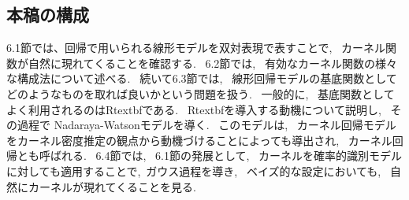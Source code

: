 \documentclass[11pt,a4paper]{jreport}
\begin{document}
\subsection*{本稿の構成}
6.1節では、回帰で用いられる線形モデルを双対表現で表すことで,~ カーネル関数が自然に現れてくることを確認する.~ 6.2節では,~ 有効なカーネル関数の様々な構成法について述べる.~ 続いて6.3節では,~ 線形回帰モデルの基底関数としてどのようなものを取れば良いかという問題を扱う.~ 一般的に,~ 基底関数としてよく利用されるのはRtextbfである.~ Rtextbfを導入する動機について説明し,~ その過程で Nadaraya-Watsonモデルを導く.~ このモデルは,~ カーネル回帰モデルをカーネル密度推定の観点から動機づけることによっても導出され,~ カーネル回帰とも呼ばれる.~ 6.4節では,~ 6.1節の発展として,~ カーネルを確率的識別モデルに対しても適用することで,~ガウス過程を導き,~ ベイズ的な設定においても,~ 自然にカーネルが現れてくることを見る.~
\end{document}
